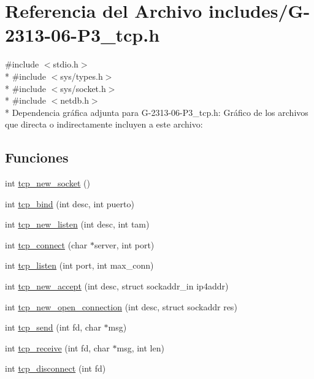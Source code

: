 \hypertarget{G-2313-06-P3__tcp_8h}{}\section{Referencia del Archivo includes/\+G-\/2313-\/06-\/\+P3\+\_\+tcp.h}
\label{G-2313-06-P3__tcp_8h}
{\ttfamily \#include $<$stdio.\+h$>$}\\*
{\ttfamily \#include $<$sys/types.\+h$>$}\\*
{\ttfamily \#include $<$sys/socket.\+h$>$}\\*
{\ttfamily \#include $<$netdb.\+h$>$}\\*
Dependencia gráfica adjunta para G-\/2313-\/06-\/\+P3\+\_\+tcp.h\+:
Gráfico de los archivos que directa o indirectamente incluyen a este archivo\+:
\subsection*{Funciones}
\begin{DoxyCompactItemize}
\item 
int \hyperlink{G-2313-06-P3__tcp_8h_a25c77773298f02f1e8135829713d7f3a}{tcp\+\_\+new\+\_\+socket} ()
\item 
int \hyperlink{G-2313-06-P3__tcp_8h_a383b8c763aedca0e2ed838e32073fde6}{tcp\+\_\+bind} (int desc, int puerto)
\item 
int \hyperlink{G-2313-06-P3__tcp_8h_a9c9d03de1e87014ced69f8d36bb37f86}{tcp\+\_\+new\+\_\+listen} (int desc, int tam)
\item 
int \hyperlink{G-2313-06-P3__tcp_8h_a4e5ce422aa030ac8b3998e858b79cae2}{tcp\+\_\+connect} (char $\ast$server, int port)
\item 
int \hyperlink{G-2313-06-P3__tcp_8h_a14d727cfbcd2ce3c5f4fae5a470a84da}{tcp\+\_\+listen} (int port, int max\+\_\+conn)
\item 
int \hyperlink{G-2313-06-P3__tcp_8h_a6bae59be22b410f157347083f2e43987}{tcp\+\_\+new\+\_\+accept} (int desc, struct sockaddr\+\_\+in ip4addr)
\item 
int \hyperlink{G-2313-06-P3__tcp_8h_a3e15d12d1405c959da073cabab3a8520}{tcp\+\_\+new\+\_\+open\+\_\+connection} (int desc, struct sockaddr res)
\item 
int \hyperlink{G-2313-06-P3__tcp_8h_a1e2b75e457a02f23d433a6821f6902b7}{tcp\+\_\+send} (int fd, char $\ast$msg)
\item 
int \hyperlink{G-2313-06-P3__tcp_8h_af3354e60e1181adcd72f9f242063fafe}{tcp\+\_\+receive} (int fd, char $\ast$msg, int len)
\item 
int \hyperlink{G-2313-06-P3__tcp_8h_a2d1f9e76e5da3a7c1e172d1294a33611}{tcp\+\_\+disconnect} (int fd)
\end{DoxyCompactItemize}


